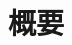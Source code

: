 \documentclass[a4paper, 12pt, dvipdfmx, uplatex]{jsreport}
\begin{document}
\chapter*{概要}
\end{document}

